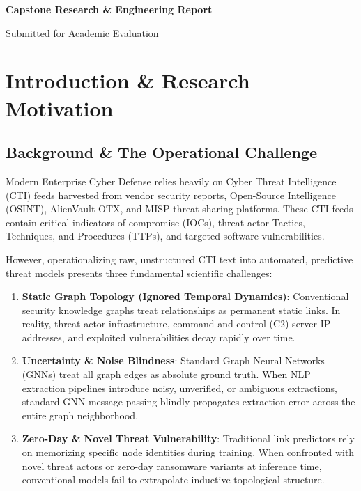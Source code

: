\documentclass[11pt,a4paper]{article}
\begin{document}
\begin{titlepage}
    \vfill
    
    {\large \textbf{Capstone Research \& Engineering Report} \par}
    {\small Submitted for Academic Evaluation \par}
    \vspace{0.8cm}
\end{titlepage}

\newpage
{}
\tableofcontents
\newpage

\section{Introduction \& Research Motivation}

\subsection{Background \& The Operational Challenge}
Modern Enterprise Cyber Defense relies heavily on Cyber Threat Intelligence (CTI) feeds harvested from vendor security reports, Open-Source Intelligence (OSINT), AlienVault OTX, and MISP threat sharing platforms. These CTI feeds contain critical indicators of compromise (IOCs), threat actor Tactics, Techniques, and Procedures (TTPs), and targeted software vulnerabilities. 

However, operationalizing raw, unstructured CTI text into automated, predictive threat models presents three fundamental scientific challenges:

\begin{enumerate}
    \item \textbf{Static Graph Topology (Ignored Temporal Dynamics)}: Conventional security knowledge graphs treat relationships as permanent static links. In reality, threat actor infrastructure, command-and-control (C2) server IP addresses, and exploited vulnerabilities decay rapidly over time.
    \item \textbf{Uncertainty \& Noise Blindness}: Standard Graph Neural Networks (GNNs) treat all graph edges as absolute ground truth. When NLP extraction pipelines introduce noisy, unverified, or ambiguous extractions, standard GNN message passing blindly propagates extraction error across the entire graph neighborhood.
    \item \textbf{Zero-Day \& Novel Threat Vulnerability}: Traditional link predictors rely on memorizing specific node identities during training. When confronted with novel threat actors or zero-day ransomware variants at inference time, conventional models fail to extrapolate inductive topological structure.
\end{enumerate}
\end{document}
